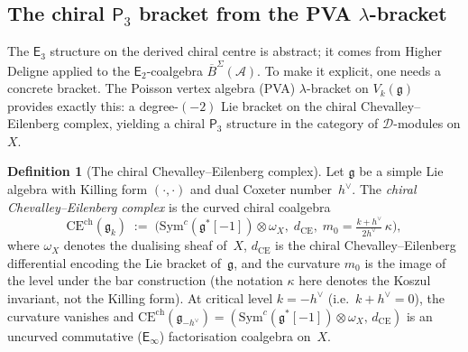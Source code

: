 \documentclass[11pt,reqno]{amsart}
\theoremstyle{definition}
\newtheorem{definition}[theorem]{Definition}
\theoremstyle{remark}
\newcommand{\cA}{\mathcal{A}}
\newcommand{\cD}{\mathcal{D}}
\newcommand{\CE}{\mathrm{CE}}
\newcommand{\Etwo}{\mathsf{E}_{2}}
\newcommand{\Ethree}{\mathsf{E}_{3}}
\newcommand{\Einf}{\mathsf{E}_{\infty}}
\newcommand{\Pthree}{\mathsf{P}_{3}}
\newcommand{\Sym}{\mathrm{Sym}}
\newcommand{\fg}{\mathfrak{g}}
\newcommand{\BarSig}{\overline{B}^{\Sigma}}
\numberwithin{equation}{section}
\begin{document}
\subsection{The chiral $\Pthree$ bracket from the PVA
$\lambda$-bracket}
\label{subsec:chiral-p3-bracket}

The $\Ethree$ structure on the derived chiral centre is
abstract; it comes from Higher Deligne applied to the
$\Etwo$-coalgebra $\BarSig(\cA)$. To make it explicit, one
needs a concrete bracket. The Poisson vertex algebra (PVA)
$\lambda$-bracket on $V_k(\fg)$ provides exactly this: a
degree-$(-2)$ Lie bracket on the chiral Chevalley--Eilenberg
complex, yielding a chiral $\Pthree$ structure in the
category of $\cD$-modules on $X$.

\begin{definition}[The chiral Chevalley--Eilenberg complex]
\label{def:chiral-ce-complex}
Let $\fg$ be a simple Lie algebra with Killing form
$(\cdot, \cdot)$ and dual Coxeter number~$h^\vee$.
The \emph{chiral Chevalley--Eilenberg complex} is
the curved chiral coalgebra
\begin{equation}\label{eq:chiral-ce-complex}
  \CE^{\mathrm{ch}}(\fg_k)
  \;:=\;
  \bigl(\Sym^c(\fg^*[-1]) \otimes \omega_X,\;
  d_{\CE},\; m_0 = \tfrac{k + h^\vee}{2h^\vee}\,\kappa\bigr),
\end{equation}
where $\omega_X$ denotes the dualising sheaf of~$X$,
$d_{\CE}$ is the chiral Chevalley--Eilenberg differential
encoding the Lie bracket of~$\fg$, and the curvature
$m_0$ is the image of the level under the bar construction
(the notation $\kappa$ here denotes the Koszul invariant,
not the Killing form).
At critical level $k = -h^\vee$ (i.e.\ $k + h^\vee = 0$), the
curvature vanishes and
$\CE^{\mathrm{ch}}(\fg_{-h^\vee}) = (\Sym^c(\fg^*[-1]) \otimes
\omega_X,\, d_{\CE})$
is an uncurved commutative ($\Einf$) factorisation
coalgebra on~$X$.
\end{definition}
\end{document}
